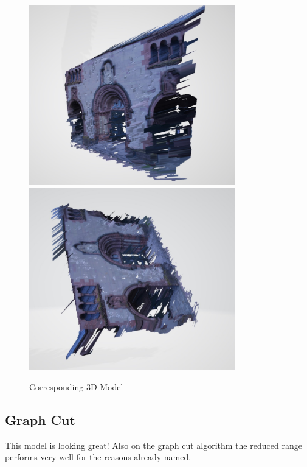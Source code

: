 \documentclass[12pt]{article}
\begin{document}
\begin{figure}[H]
	\centering
	\includegraphics[width=0.8\textwidth]{5.jpg}
	\includegraphics[width=0.8\textwidth]{6.jpg}
	\caption{Corresponding 3D Model}
	\label{fig1}
\end{figure}

\subsection{Graph Cut}
This model is looking great! Also on the graph cut algorithm the reduced range performs very well for the reasons already named. 
\end{document}
